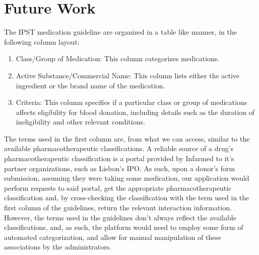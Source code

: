 \chapter{Future Work} \label{cap:future}

The IPST medication guideline are organized in a table like manner, in the following column layout:
\begin{enumerate}
	\item Class/Group of Medication: This column categorizes medications.
	\item Active Substance/Commercial Name: This column lists either the active ingredient or the brand name of the medication.
	\item Criteria: This column specifies if a particular class or group of medications affects eligibility for blood donation, including details such as the duration of ineligibility and other relevant conditions.
\end{enumerate}
The terms used in the first column are, from what we can access, similar to the available pharmacotherapeutic classifications. A reliable source of a drug's pharmacotherapeutic classification is a portal provided by Infarmed to it's partner organizations, such as Lisbon's IPO.
As such, upon a donor's form submission, assuming they were taking some medication, our application would perform requests to said portal, get the appropriate pharmacotherapeutic classification and, by cross-checking the classification with the term used in the first column of the guidelines, return the relevant interaction information.
However, the terms used in the guidelines don't always reflect the available classifications, and, as such, the platform would need to employ some form of automated categorization, and allow for manual manipulation of these associations by the administrators.
